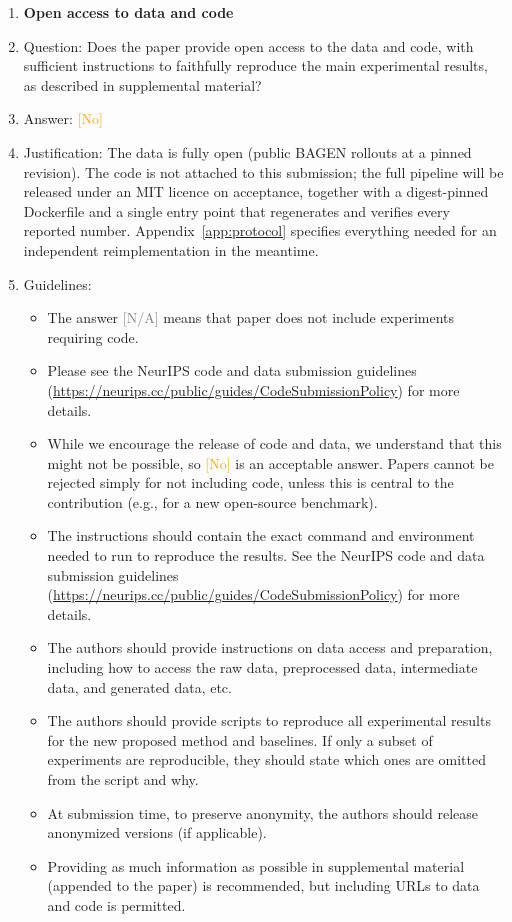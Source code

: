 \documentclass{article}
\providecommand{\answerNo}[1][]{\textcolor{orange}{[No] #1}}
\providecommand{\answerNA}[1][]{\textcolor{gray}{[N/A] #1}}
\begin{document}
\begin{enumerate}
\item {\bf Open access to data and code}
    \item[] Question: Does the paper provide open access to the data and code, with sufficient instructions to faithfully reproduce the main experimental results, as described in supplemental material?
    \item[] Answer: \answerNo{}
    \item[] Justification: The data is fully open (public BAGEN rollouts at a pinned revision). The code is not attached to this submission; the full pipeline will be released under an MIT licence on acceptance, together with a digest-pinned Dockerfile and a single entry point that regenerates and verifies every reported number. Appendix~\ref{app:protocol} specifies everything needed for an independent reimplementation in the meantime.
    \item[] Guidelines:
    \begin{itemize}
        \item The answer \answerNA{} means that paper does not include experiments requiring code.
        \item Please see the NeurIPS code and data submission guidelines (\url{https://neurips.cc/public/guides/CodeSubmissionPolicy}) for more details.
        \item While we encourage the release of code and data, we understand that this might not be possible, so \answerNo{} is an acceptable answer. Papers cannot be rejected simply for not including code, unless this is central to the contribution (e.g., for a new open-source benchmark).
        \item The instructions should contain the exact command and environment needed to run to reproduce the results. See the NeurIPS code and data submission guidelines (\url{https://neurips.cc/public/guides/CodeSubmissionPolicy}) for more details.
        \item The authors should provide instructions on data access and preparation, including how to access the raw data, preprocessed data, intermediate data, and generated data, etc.
        \item The authors should provide scripts to reproduce all experimental results for the new proposed method and baselines. If only a subset of experiments are reproducible, they should state which ones are omitted from the script and why.
        \item At submission time, to preserve anonymity, the authors should release anonymized versions (if applicable).
        \item Providing as much information as possible in supplemental material (appended to the paper) is recommended, but including URLs to data and code is permitted.
    \end{itemize}


\end{enumerate}
\end{document}
